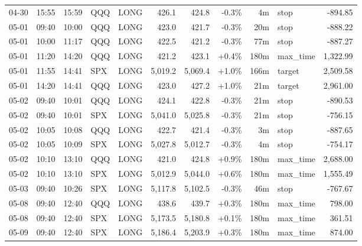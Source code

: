 \documentclass[11pt,a4paper,twoside]{article}
\begin{document}
\begin{center}
\begin{longtable}{>{\color{txtmain}}l l l l l r r r r >{\color{txtmain}}l r}
04-30 & 15:55 & 15:59 & QQQ & LONG & 426.1 & 424.8 & \textcolor{lossred}{-0.3\%} & 4m & stop & \textcolor{lossred}{-894.85} \\
05-01 & 09:40 & 10:00 & QQQ & LONG & 423.0 & 421.7 & \textcolor{lossred}{-0.3\%} & 20m & stop & \textcolor{lossred}{-888.22} \\
05-01 & 10:00 & 11:17 & QQQ & LONG & 422.5 & 421.2 & \textcolor{lossred}{-0.3\%} & 77m & stop & \textcolor{lossred}{-887.27} \\
05-01 & 11:20 & 14:20 & QQQ & LONG & 421.2 & 423.1 & \textcolor{wingreen}{+0.4\%} & 180m & max\_time & \textcolor{wingreen}{1,322.99} \\
05-01 & 11:55 & 14:41 & SPX & LONG & 5,019.2 & 5,069.4 & \textcolor{wingreen}{+1.0\%} & 166m & target & \textcolor{wingreen}{2,509.58} \\
05-01 & 14:20 & 14:41 & QQQ & LONG & 423.0 & 427.2 & \textcolor{wingreen}{+1.0\%} & 21m & target & \textcolor{wingreen}{2,961.00} \\
05-02 & 09:40 & 10:01 & QQQ & LONG & 424.1 & 422.8 & \textcolor{lossred}{-0.3\%} & 21m & stop & \textcolor{lossred}{-890.53} \\
05-02 & 09:40 & 10:01 & SPX & LONG & 5,041.0 & 5,025.8 & \textcolor{lossred}{-0.3\%} & 21m & stop & \textcolor{lossred}{-756.15} \\
05-02 & 10:05 & 10:08 & QQQ & LONG & 422.7 & 421.4 & \textcolor{lossred}{-0.3\%} & 3m & stop & \textcolor{lossred}{-887.65} \\
05-02 & 10:05 & 10:09 & SPX & LONG & 5,027.8 & 5,012.7 & \textcolor{lossred}{-0.3\%} & 4m & stop & \textcolor{lossred}{-754.17} \\
05-02 & 10:10 & 13:10 & QQQ & LONG & 421.0 & 424.8 & \textcolor{wingreen}{+0.9\%} & 180m & max\_time & \textcolor{wingreen}{2,688.00} \\
05-02 & 10:10 & 13:10 & SPX & LONG & 5,012.9 & 5,044.0 & \textcolor{wingreen}{+0.6\%} & 180m & max\_time & \textcolor{wingreen}{1,555.49} \\
05-03 & 09:40 & 10:26 & SPX & LONG & 5,117.8 & 5,102.5 & \textcolor{lossred}{-0.3\%} & 46m & stop & \textcolor{lossred}{-767.67} \\
05-08 & 09:40 & 12:40 & QQQ & LONG & 438.6 & 439.7 & \textcolor{wingreen}{+0.3\%} & 180m & max\_time & \textcolor{wingreen}{798.00} \\
05-08 & 09:40 & 12:40 & SPX & LONG & 5,173.5 & 5,180.8 & \textcolor{wingreen}{+0.1\%} & 180m & max\_time & \textcolor{wingreen}{361.51} \\
05-09 & 09:40 & 12:40 & SPX & LONG & 5,186.4 & 5,203.9 & \textcolor{wingreen}{+0.3\%} & 180m & max\_time & \textcolor{wingreen}{874.00} \\

\end{longtable}
\end{center}
\end{document}

